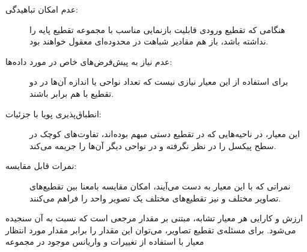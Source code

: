 \begin{description}
	\item[عدم امکان تباهیدگی:]
	هنگامی که تقطیع ورودی قابلیت بازنمایی مناسب با مجموعه تقطیع پایه را نداشته باشد، باز هم مقادیر شباهت در محدوده‌ای معقول خواهند بود.
	\item[عدم نیاز به پیش‌فرض‌های خاص در مورد داده‌ها:]
	برای استفاده از این معیار نیازی نیست که تعداد نواحی یا اندازه آن‌ها در دو تقطیع با هم برابر باشند.
	\item[انطباق‌پذیری پویا با جزئیات:]
	این معیار، در ناحیه‌هایی که در تقطیع دستی مبهم بوده‌اند، تفاوت‌های کوچک در سطح پیکسل را در نظر نگرفته و در نواحی دیگر آن‌ها را جریمه می‌کند.
	\item[نمرات قابل مقایسه:]
	نمراتی که با این معیار به دست می‌آیند، امکان مقایسه بامعنا بین تقطیع‌های تصاویر مختلف و نیز تقطیع‌های مختلف یک تصویر واحد را فراهم می‌کنند.
\end{description}

ارزش و کارایی هر معیار تشابه، مبتنی بر مقدار مرجعی است که نسبت به آن سنجیده می‌شود.
برای مسئله‌ی تقطیع تصاویر، می‌توان این مقدار را برابر مقدار مورد انتظار معیار با استفاده از تغییرات و واریانس موجود در مجموعه 






